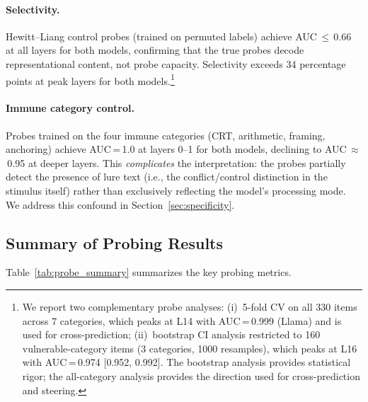 \documentclass[accepted]{article}
\begin{document}
\paragraph{Selectivity.}  Hewitt--Liang control probes (trained on
permuted labels) achieve AUC\,$\leq$\,0.66 at all layers for both models,
confirming that the true probes decode representational content, not
probe capacity.  Selectivity exceeds 34 percentage points at peak layers
for both models.\footnote{We report two complementary probe analyses:
  (i)~5-fold CV on all 330 items across 7 categories, which peaks at L14
  with AUC\,=\,0.999 (Llama) and is used for cross-prediction;
  (ii)~bootstrap CI analysis restricted to 160 vulnerable-category items
  (3 categories, 1000 resamples), which peaks at L16 with
  AUC\,=\,0.974 [0.952, 0.992].  The bootstrap analysis provides
  statistical rigor; the all-category analysis provides the direction
  used for cross-prediction and steering.}

\paragraph{Immune category control.}  Probes trained on the four immune
categories (CRT, arithmetic, framing, anchoring) achieve
AUC\,=\,1.0 at layers 0--1 for both models, declining to
AUC\,$\approx$\,0.95 at deeper layers.  This \emph{complicates} the
interpretation: the probes partially detect the presence of lure text
(i.e., the conflict/control distinction in the stimulus itself) rather
than exclusively reflecting the model's processing mode.  We address
this confound in Section~\ref{sec:specificity}.

\subsection{Summary of Probing Results}

Table~\ref{tab:probe_summary} summarizes the key probing metrics.
\end{document}
